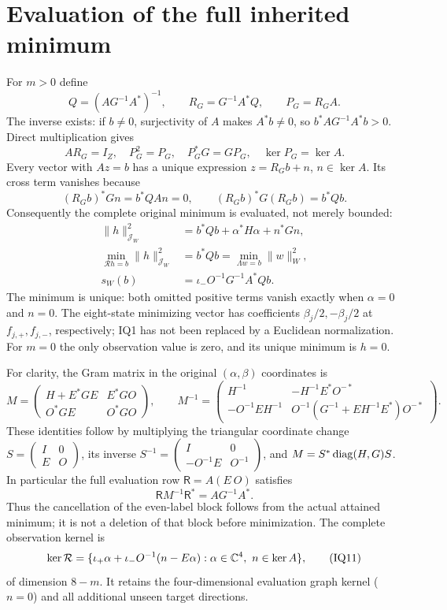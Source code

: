 \section{Evaluation of the full inherited minimum}
For $m>0$ define
\[
 Q=(AG^{-1}A^*)^{-1},\qquad R_G=G^{-1}A^*Q,\qquad
 P_G=R_GA.                                          \tag{IQ6}
\]
The inverse exists: if $b\ne0$, surjectivity of $A$ makes $A^*b\ne0$,
so $b^*AG^{-1}A^*b>0$.  Direct multiplication gives
\[
 AR_G=I_Z,\quad P_G^2=P_G,\quad P_G^*G=GP_G,
 \quad\ker P_G=\ker A.                              \tag{IQ7}
\]
Every vector with $Az=b$ has a unique expression $z=R_Gb+n$, $n\in\ker A$.
Its cross term vanishes because
\[
 (R_Gb)^*Gn=b^*QA n=0,\qquad
 (R_Gb)^*G(R_Gb)=b^*Qb.
\]
Consequently the complete original minimum is evaluated, not merely bounded:
\[
 \begin{split}
 \|h\|_{\mathcal J_W}^2
   &=b^*Qb+\alpha^*H\alpha+n^*Gn,\\
 \min_{\mathcal Rh=b}\|h\|_{\mathcal J_W}^2
   &=b^*Qb
    =\min_{\Lambda w=b}\|w\|_W^2,\\
 s_W(b)&=\iota_-O^{-1}G^{-1}A^*Qb.
 \end{split}                                       \tag{IQ8}
\]
The minimum is unique: both omitted positive terms vanish exactly when
$\alpha=0$ and $n=0$.  The eight-state minimizing vector has coefficients
$\beta_j/2,-\beta_j/2$ at $f_{j,+},f_{j,-}$, respectively; IQ1 has not been
replaced by a Euclidean normalization.  For $m=0$ the only observation value
is zero, and its unique minimum is $h=0$.

For clarity, the Gram matrix in the original $(\alpha,\beta)$ coordinates is
\[
 M=\begin{pmatrix}
 H+E^*GE&E^*GO\\ O^*GE&O^*GO
 \end{pmatrix},\qquad
 M^{-1}=\begin{pmatrix}
 H^{-1}&-H^{-1}E^*O^{-*}\\
 -O^{-1}EH^{-1}&O^{-1}(G^{-1}+EH^{-1}E^*)O^{-*}
 \end{pmatrix}.                                    \tag{IQ9}
\]
These identities follow by multiplying the triangular coordinate change
$S=\left(\begin{smallmatrix}I&0\\E&O\end{smallmatrix}\right)$, its inverse
$S^{-1}=\left(\begin{smallmatrix}I&0\\-O^{-1}E&O^{-1}\end{smallmatrix}\right)$,
and $M=S^*\operatorname{diag}(H,G)S$.  In particular the full evaluation row
$\mathsf R=A(E\ O)$ satisfies
\[
 \mathsf R M^{-1}\mathsf R^*=AG^{-1}A^*.              \tag{IQ10}
\]
Thus the cancellation of the even-label block follows from the actual
attained minimum; it is not a deletion of that block before minimization.
The complete observation kernel is
\[
 \ker\mathcal R=
 \{\iota_+\alpha+\iota_-O^{-1}(n-E\alpha):
             \alpha\in\mathbb C^4,\ n\in\ker A\},          \tag{IQ11}
\]
of dimension $8-m$.  It retains the four-dimensional evaluation graph
kernel ($n=0$) and all additional unseen target directions.

